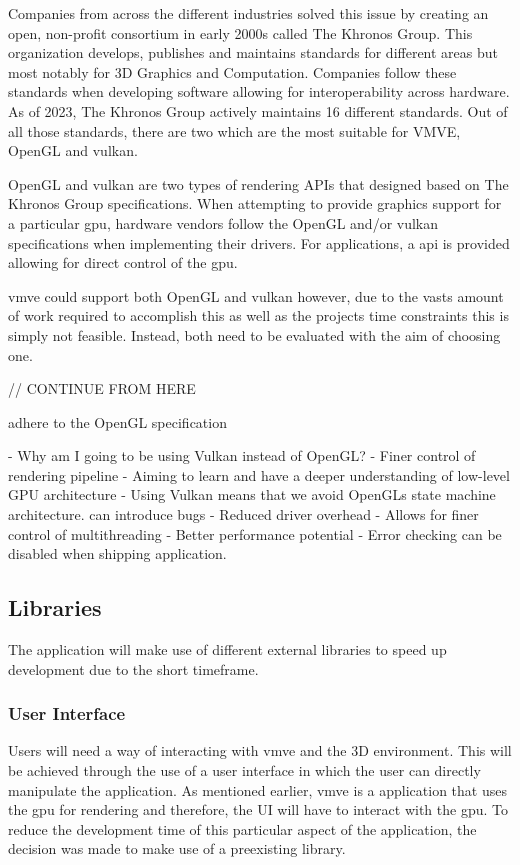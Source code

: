 \documentclass[11pt]{article}
\begin{document}
Companies from across the different industries solved this issue by creating
an open, non-profit consortium in early 2000s called The Khronos Group. This
organization develops, publishes and maintains standards for different areas
but most notably for 3D Graphics and Computation. Companies follow these 
standards when developing software allowing for interoperability across
hardware. As of 2023, The Khronos Group actively maintains 16 different
standards. Out of all those standards, there are two which are the most
suitable for VMVE, OpenGL and \gls{vulkan}.

OpenGL and \gls{vulkan} are two types of rendering APIs that designed based on
The Khronos Group specifications. When attempting to provide graphics support
for a particular \gls{gpu}, hardware vendors follow the OpenGL and/or \gls{vulkan}
specifications when implementing their drivers. For applications, a
\acrfull{api} is provided allowing for direct control of the \gls{gpu}.

\gls{vmve} could support both OpenGL and \gls{vulkan} however, due to the vasts
amount of work required to accomplish this as well as the projects time
constraints this is simply not feasible. Instead, both need to be evaluated with
the aim of choosing one.



// CONTINUE FROM HERE

adhere to the OpenGL specification

- Why am I going to be using Vulkan instead of OpenGL?
-   Finer control of rendering pipeline
-   Aiming to learn and have a deeper understanding of low-level GPU architecture
-   Using Vulkan means that we avoid OpenGLs state machine architecture.
    can introduce bugs
-   Reduced driver overhead
-   Allows for finer control of multithreading
-   Better performance potential
-   Error checking can be disabled when shipping application.



\subsection{Libraries}
The application will make use of different external libraries to speed up 
development due to the short timeframe.

\subsubsection{User Interface}
Users will need a way of interacting with \gls{vmve} and the 3D environment.
This will be achieved through the use of a user interface in which the user can
directly manipulate the application. As mentioned earlier, \gls{vmve} is a
application that uses the \gls{gpu} for rendering and therefore, the UI will
have to interact with the \gls{gpu}. To reduce the development time of this
particular aspect of the application, the decision was made to make use of a
preexisting library.
\end{document}
